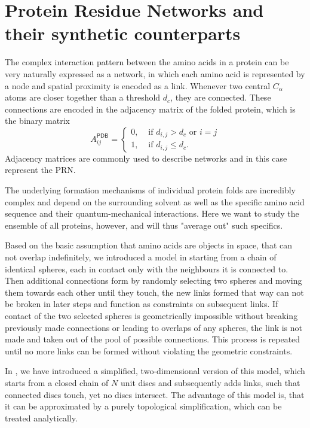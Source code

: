 \documentclass[reprint,amsmath,amssymb,rmp,onecolumn,notitlepage,11pt]{revtex4-1}
\begin{document}


\section*{Protein Residue Networks and their synthetic counterparts}
The complex interaction pattern between the amino acids in a protein can be very naturally expressed as a network, in which each amino acid is represented by a node and spatial proximity is encoded as a link. Whenever two central $C_\alpha$ atoms are closer together than a threshold $d_c$, they are connected. These connections are encoded in the adjacency matrix of the folded protein, which is the binary matrix
\begin{equation}
  A^{\textsf{PDB}}_{ij}=
  \begin{cases}
   0, & \text{ if } d_{i,j}>d_c \text{ or } i=j\\
      1, & \text{ if } d_{i,j}\leq d_c .
      \end{cases}
    \label{eq:aij}
\end{equation}
Adjacency matrices are commonly used to describe networks and in this case represent the PRN.

The underlying formation mechanisms of individual protein folds are incredibly complex and depend on the surrounding solvent as well as the specific amino acid sequence and their quantum-mechanical interactions. Here we want to study the ensemble of all proteins, however, and will thus "average out" such specifics.

Based on the basic assumption that amino acids are objects in space, that can not overlap indefinitely, we introduced a model in \cite{molkenthin2020self} starting from a chain of identical spheres, each in contact only with the neighbours it is connected to. Then additional connections form by randomly selecting two spheres and moving them towards each other until they touch, the new links formed that way can not be broken in later steps and function as constraints on subsequent links. If contact of the two selected spheres is geometrically impossible without breaking previously made connections or leading to overlaps of any spheres, the link is not made and taken out of the pool of possible connections. This process is repeated until no more links can be formed without violating the geometric constraints.

In \cite{molkenthin2016scaling}, we have introduced a simplified, two-dimensional version of this model, which starts from a closed chain of $N$ unit discs and subsequently adds links, such that connected discs touch, yet no discs intersect. The advantage of this model is, that it can be approximated by a purely topological simplification, which can be treated analytically.
\end{document}
